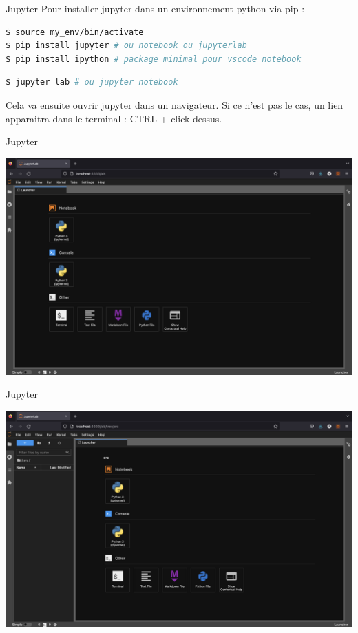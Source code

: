 \begin{frame}[fragile]{Jupyter}
  Pour installer jupyter dans un environnement python via pip :
  \begin{lstlisting}[language=bash, morekeywords=\$, numbers=none]
$ source my_env/bin/activate
$ pip install jupyter # ou notebook ou jupyterlab
$ pip install ipython # package minimal pour vscode notebook
  \end{lstlisting}

    \begin{lstlisting}[language=bash, morekeywords=\$, numbers=none]
$ jupyter lab # ou jupyter notebook
  \end{lstlisting}
  Cela va ensuite ouvrir jupyter dans un navigateur. Si ce n'est pas le cas, un
  lien apparaitra dans le terminal : CTRL + click dessus.
\end{frame}

\begin{frame}{Jupyter}
  \begin{center}
    \includegraphics[width=\textwidth]{img/jupyter-lab-1.png}
  \end{center}
\end{frame}

\begin{frame}{Jupyter}
  \begin{center}
    \includegraphics[width=\textwidth]{img/jupyter-lab-2.png}
  \end{center}
\end{frame}

